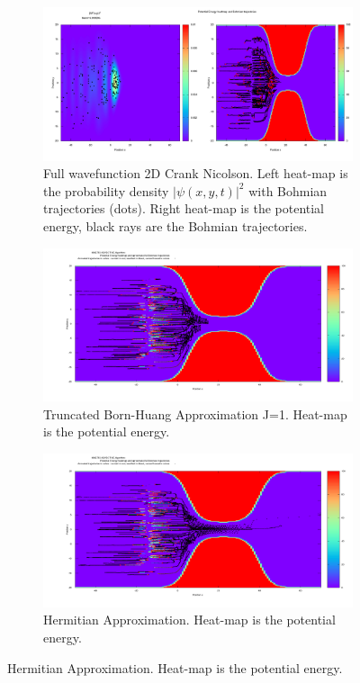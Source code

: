 \documentclass[11pt, a4paper]{article} %
\begin{document}
 \begin{figure}[h!]
  \centering
  \begin{subfigure}[b]{0.7\linewidth}
    \includegraphics[width=\linewidth]{k0_0.1_CN_GS.png}
    \caption{Full wavefunction 2D Crank Nicolson. Left heat-map is the probability density $|\psi(x,y,t)|^2$ with Bohmian trajectories (dots). Right heat-map is the potential energy, black rays are the Bohmian trajectories.}
  \end{subfigure}
  \begin{subfigure}[b]{0.7\linewidth}
    \includegraphics[width=\linewidth]{k0_0.1_TBH_GS.png}
    \caption{Truncated Born-Huang Approximation J=1. Heat-map is the potential energy.}
  \end{subfigure}
  \begin{subfigure}[b]{0.7\linewidth}
    \includegraphics[width=\linewidth]{k0_0.1_XO_GS.png}
    \caption{Hermitian Approximation. Heat-map is the potential energy.}
  \end{subfigure}
  

\end{figure}
\end{document}
